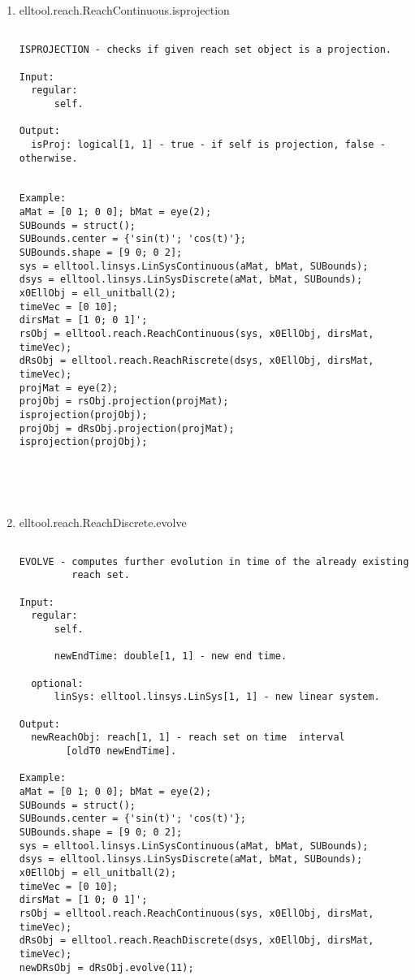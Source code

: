 \begin{enumerate}
\begin{lstlisting}
\end{lstlisting}
\fontfamily{\familydefault}
\selectfont
\item {elltool.reach.ReachContinuous.isprojection}
\selectfont
\begin{lstlisting}

ISPROJECTION - checks if given reach set object is a projection.

Input:
  regular:
      self.

Output:
  isProj: logical[1, 1] - true - if self is projection, false - otherwise.


Example:
aMat = [0 1; 0 0]; bMat = eye(2);
SUBounds = struct();
SUBounds.center = {'sin(t)'; 'cos(t)'};
SUBounds.shape = [9 0; 0 2];
sys = elltool.linsys.LinSysContinuous(aMat, bMat, SUBounds);
dsys = elltool.linsys.LinSysDiscrete(aMat, bMat, SUBounds);
x0EllObj = ell_unitball(2);
timeVec = [0 10];
dirsMat = [1 0; 0 1]';
rsObj = elltool.reach.ReachContinuous(sys, x0EllObj, dirsMat, timeVec);
dRsObj = elltool.reach.ReachRiscrete(dsys, x0EllObj, dirsMat, timeVec);
projMat = eye(2);
projObj = rsObj.projection(projMat);
isprojection(projObj);
projObj = dRsObj.projection(projMat);
isprojection(projObj);





\end{lstlisting}
\fontfamily{\familydefault}
\selectfont
\item {elltool.reach.ReachDiscrete.evolve}
\selectfont
\begin{lstlisting}

EVOLVE - computes further evolution in time of the already existing
         reach set.

Input:
  regular:
      self.

      newEndTime: double[1, 1] - new end time.

  optional:
      linSys: elltool.linsys.LinSys[1, 1] - new linear system.

Output:
  newReachObj: reach[1, 1] - reach set on time  interval
        [oldT0 newEndTime].

Example:
aMat = [0 1; 0 0]; bMat = eye(2);
SUBounds = struct();
SUBounds.center = {'sin(t)'; 'cos(t)'};
SUBounds.shape = [9 0; 0 2];
sys = elltool.linsys.LinSysContinuous(aMat, bMat, SUBounds);
dsys = elltool.linsys.LinSysDiscrete(aMat, bMat, SUBounds);
x0EllObj = ell_unitball(2);
timeVec = [0 10];
dirsMat = [1 0; 0 1]';
rsObj = elltool.reach.ReachContinuous(sys, x0EllObj, dirsMat, timeVec);
dRsObj = elltool.reach.ReachDiscrete(dsys, x0EllObj, dirsMat, timeVec);
newDRsObj = dRsObj.evolve(11);






\end{lstlisting}
\end{enumerate}
